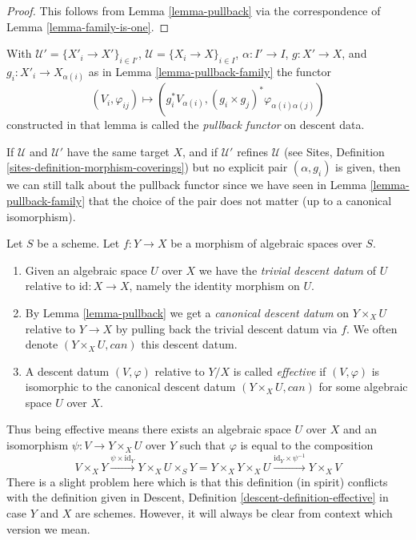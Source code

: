 \begin{proof}
This follows from Lemma \ref{lemma-pullback} via the
correspondence of Lemma \ref{lemma-family-is-one}.
\end{proof}

\begin{definition}
\label{definition-pullback-functor-family}
With $\mathcal{U}' = \{X'_i \to X'\}_{i \in I'}$,
$\mathcal{U} = \{X_i \to X\}_{i \in I}$, $\alpha : I' \to I$,
$g : X' \to X$, and $g_i : X'_i \to X_{\alpha(i)}$ as in
Lemma \ref{lemma-pullback-family} the functor
$$
(V_i, \varphi_{ij}) \longmapsto
(g_i^*V_{\alpha(i)}, (g_i \times g_j)^*\varphi_{\alpha(i) \alpha(j)})
$$
constructed in that lemma
is called the {\it pullback functor} on descent data.
\end{definition}

\noindent
If $\mathcal{U}$ and $\mathcal{U}'$ have the same target $X$,
and if $\mathcal{U}'$ refines $\mathcal{U}$ (see
Sites, Definition \ref{sites-definition-morphism-coverings})
but no explicit pair $(\alpha, g_i)$ is given, then we can still
talk about the pullback functor since we have seen in
Lemma \ref{lemma-pullback-family} that the choice of the pair does not matter
(up to a canonical isomorphism).

\begin{definition}
\label{definition-effective}
Let $S$ be a scheme. Let $f : Y \to X$ be a morphism of algebraic spaces over
$S$.
\begin{enumerate}
\item Given an algebraic space $U$ over $X$ we have the
{\it trivial descent datum} of $U$ relative to $\text{id} : X \to X$, namely
the identity morphism on $U$.
\item By Lemma \ref{lemma-pullback} we get a
{\it canonical descent datum} on $Y \times_X U$
relative to $Y \to X$ by pulling back the trivial
descent datum via $f$. We often
denote $(Y \times_X U, can)$ this descent datum.
\item A descent datum $(V, \varphi)$ relative to $Y/X$
is called {\it effective} if $(V, \varphi)$
is isomorphic to the canonical descent datum
$(Y \times_X U, can)$ for some algebraic space $U$ over $X$.
\end{enumerate}
\end{definition}

\noindent
Thus being effective means there exists an algebraic space $U$
over $X$ and an isomorphism $\psi : V \to Y \times_X U$
over $Y$ such that $\varphi$ is equal to the composition
$$
V \times_X Y \xrightarrow{\psi \times \text{id}_Y}
Y \times_X U \times_S Y =
Y \times_X Y \times_X U
\xrightarrow{\text{id}_Y \times \psi^{-1}}
Y \times_X V
$$
There is a slight problem here which is that this definition
(in spirit) conflicts with the definition given in
Descent, Definition \ref{descent-definition-effective}
in case $Y$ and $X$ are schemes. However, it will always be clear from
context which version we mean.

